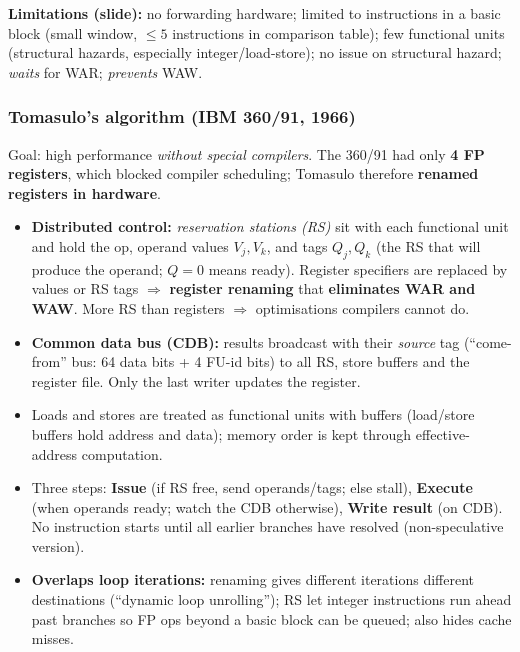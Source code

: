 \textbf{Limitations (slide):} no forwarding hardware; limited to instructions in a basic block (small window, $\le5$ instructions in comparison table); few functional units (structural hazards, especially integer/load-store); no issue on structural hazard; \emph{waits} for WAR; \emph{prevents} WAW.

\subsubsection{Tomasulo's algorithm (IBM 360/91, 1966)}
Goal: high performance \emph{without special compilers}. The 360/91 had only \textbf{4 FP registers}, which blocked compiler scheduling; Tomasulo therefore \textbf{renamed registers in hardware}.
\begin{itemize}
\item \textbf{Distributed control:} \emph{reservation stations (RS)} sit with each functional unit and hold the op, operand values $V_j,V_k$, and tags $Q_j,Q_k$ (the RS that will produce the operand; $Q=0$ means ready). Register specifiers are replaced by values or RS tags $\Rightarrow$ \textbf{register renaming} that \textbf{eliminates WAR and WAW}. More RS than registers $\Rightarrow$ optimisations compilers cannot do.
\item \textbf{Common data bus (CDB):} results broadcast with their \emph{source} tag (``come-from'' bus: 64 data bits + 4 FU-id bits) to all RS, store buffers and the register file. Only the last writer updates the register.
\item Loads and stores are treated as functional units with buffers (load/store buffers hold address and data); memory order is kept through effective-address computation.
\item Three steps: \textbf{Issue} (if RS free, send operands/tags; else stall), \textbf{Execute} (when operands ready; watch the CDB otherwise), \textbf{Write result} (on CDB). No instruction starts until all earlier branches have resolved (non-speculative version).
\item \textbf{Overlaps loop iterations:} renaming gives different iterations different destinations (``dynamic loop unrolling''); RS let integer instructions run ahead past branches so FP ops beyond a basic block can be queued; also hides cache misses.
\end{itemize}

